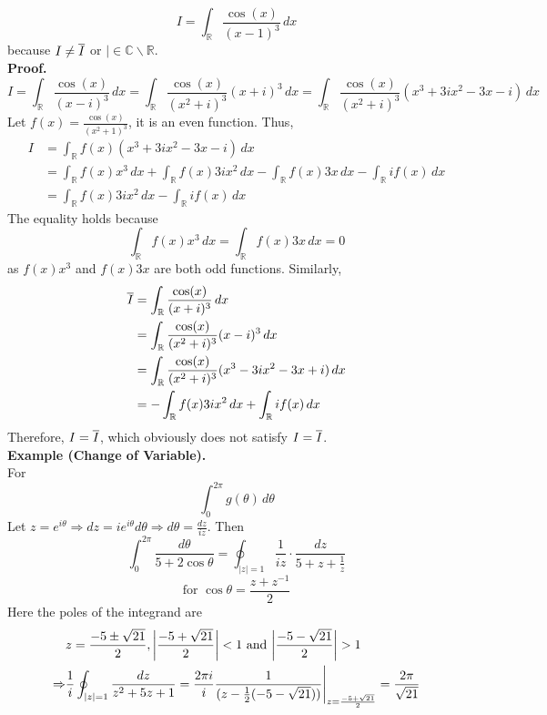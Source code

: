 \documentclass[11pt]{article}
\DeclarePairedDelimiter\abs{\lvert}{\rvert}
\begin{document}
$$ I = \int_{\mathbb{R}}\frac{\cos(x)}{(x - 1)^3} \,dx$$
because $I \neq \overline{I}$ or $| \in \mathbb{C} \backslash \mathbb{R}$. \\
\textbf{Proof.} 
$$ I = \int_{\mathbb{R}}\frac{\cos(x)}{(x - i)^3} \,dx = \int_{\mathbb{R}}\frac{\cos(x)}{(x^2 + i)^3}(x + i)^3 \,dx = \int_{\mathbb{R}}\frac{\cos(x)}{(x^2 + i)^3}(x^3 + 3ix^2 - 3x - i) \,dx $$
Let $f(x) = \frac{\cos(x)}{(x^2 + 1)^3}$, it is an even function. Thus, 
\begin{align*}
I &= \int_{\mathbb{R}}f(x) (x^3 + 3ix^2 - 3x - i) \, dx \\
&= \int_{\mathbb{R}}f(x)x^3 \,dx + \int_{\mathbb{R}}f(x)3ix^2 \,dx - \int_{\mathbb{R}}f(x)3x\,dx -  \int_{\mathbb{R}}if(x)\,dx \\
&= \int_{\mathbb{R}}f(x) 3ix^2 \,dx - \int_{\mathbb{R}}if(x)\,dx 
\end{align*}
The equality holds because 
$$ \int_{\mathbb{R}}f(x)x^3 \, dx = \int_{\mathbb{R}}f(x)3x \, dx = 0$$ 
as $f(x)x^3$ and $f(x)3x$ are both odd functions. Similarly, 
\begin{align*}
\overline{I} &= \int_{\mathbb{R}}\frac{\cos(x)}{(x + i)^3} \,dx \\
&= \int_{\mathbb{R}}\frac{\cos(x)}{(x^2 + i)^3}(x - i)^3 \,dx \\
&= \int_{\mathbb{R}}\frac{\cos(x)}{(x^2 + i)^3}(x^3 - 3ix^2 - 3x + i) \,dx \\
&= -\int_{\mathbb{R}}f(x) 3ix^2 \,dx + \int_{\mathbb{R}}if(x)\,dx
\end{align*}
Therefore, $I = \overline{I}$, which obviously does not satisfy $I = \overline{I}$. \\
\newline
\textbf{Example (Change of Variable). }\\
For 
$$ \int_0^{2\pi}g(\theta) \, d\theta$$ 
Let $z = e^{i\theta} \Rightarrow dz = ie^{i\theta}d\theta \Rightarrow d\theta = \frac{dz}{iz}$. Then 
$$ \int_0^{2\pi} \frac{d\theta}{5 + 2\cos\theta} = \oint_{|z| = 1}\frac{1}{iz}\cdot\frac{dz}{5 + z + \frac{1}{z}}$$ 
$$\text{for } \cos\theta = \frac{z + z^{-1}}{2}$$ 
Here the poles of the integrand are 
\begin{align*}
&z = \frac{-5 \pm \sqrt{21}}{2}, \abs*{\frac{-5 + \sqrt{21}}{2}} < 1 \text{ and } \abs*{\frac{-5 - \sqrt{21}}{2}} > 1 \\
\Rightarrow &\frac{1}{i} \oint_{|z| = 1} \frac{dz}{z^2 + 5z + 1} = \frac{2\pi i}{i} \frac{1}{(z - \frac{1}{2}(-5 - \sqrt{21}))} \Bigg\rvert_{z = \frac{-5 + \sqrt{21}}{2}} = \frac{2\pi}{\sqrt{21}}
\end{align*}
\end{document}
